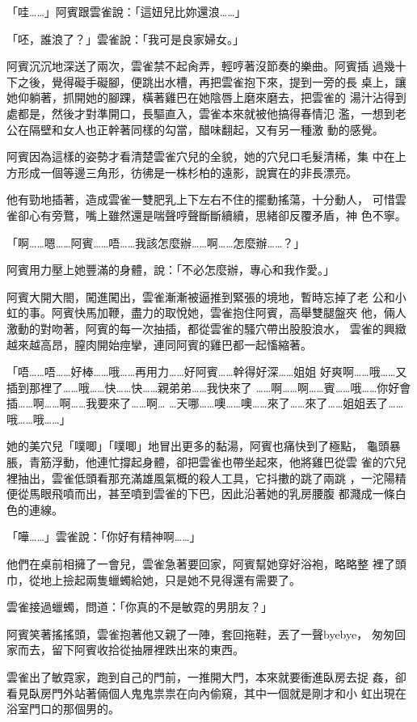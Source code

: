 「哇……」阿賓跟雲雀說：「這妞兒比妳還浪……」

「呸，誰浪了？」雲雀說：「我可是良家婦女。」

阿賓沉沉地深送了兩次，雲雀禁不起肏弄，輕哼著沒節奏的樂曲。阿賓插
過幾十下之後，覺得礙手礙腳，便跳出水槽，再把雲雀抱下來，提到一旁的長
桌上，讓她仰躺著，抓開她的腳踝，橫著雞巴在她陰唇上磨來磨去，把雲雀的
湯汁沾得到處都是，然後才對準開口，長驅直入，雲雀本來就被他搞得春情氾
濫，一想到老公在隔壁和女人也正幹著同樣的勾當，醋味翻起，又有另一種激
動的感覺。

阿賓因為這樣的姿勢才看清楚雲雀穴兒的全貌，她的穴兒口毛髮清稀，集
中在上方形成一個等邊三角形，彷彿是一株杉柏的遠影，說實在的非長漂亮。

他有勁地插著，造成雲雀一雙肥乳上下左右不住的擺動搖蕩，十分動人，
可惜雲雀卻心有旁鶩，嘴上雖然還是喘聲哼聲斷斷續續，思緒卻反覆矛盾，神
色不寧。

「啊……嗯……阿賓……唔……我該怎麼辦……啊……怎麼辦……？」

阿賓用力壓上她豐滿的身體，說：「不必怎麼辦，專心和我作愛。」

阿賓大開大閤，闖進闖出，雲雀漸漸被逼推到緊張的境地，暫時忘掉了老
公和小虹的事。阿賓快馬加鞭，盡力的取悅她，雲雀抱住阿賓，高舉雙腿盤夾
他，倆人激動的對吻著，阿賓的每一次抽插，都從雲雀的騷穴帶出股股浪水，
雲雀的興緻越來越高昂，膣肉開始痙攣，連同阿賓的雞巴都一起慉縮著。

「唔……唔……好棒……哦……再用力……好阿賓……幹得好深……姐姐
好爽啊……哦……又插到那裡了……哦……快……快……親弟弟……我快來了
……啊……啊……賓……哦……你好會插……啊……啊……我要來了……啊…
…天哪……噢……噢……來了……來了……姐姐丟了……哦……哦……」

她的美穴兒「噗唧」「噗唧」地冒出更多的黏湯，阿賓也痛快到了極點，
龜頭暴脹，青筋浮動，他連忙撐起身體，卻把雲雀也帶坐起來，他將雞巴從雲
雀的穴兒裡抽出，雲雀低頭看那充滿雄風氣概的殺人工具，它抖擻的跳了兩跳
，一沱陽精便從馬眼飛噴而出，甚至噴到雲雀的下巴，因此沿著她的乳房腰腹
都濺成一條白色的連線。

「嘩……」雲雀說：「你好有精神啊……」

他們在桌前相擁了一會兒，雲雀急著要回家，阿賓幫她穿好浴袍，略略整
裡了頭巾，從地上撿起兩隻蠟蠋給她，只是她不見得還有需要了。

雲雀接過蠟蠋，問道：「你真的不是敏霓的男朋友？」

阿賓笑著搖搖頭，雲雀抱著他又親了一陣，套回拖鞋，丟了一聲byebye，
匆匆回家而去，留下阿賓收拾從抽屜裡跌出來的東西。

雲雀出了敏霓家，跑到自己的門前，一推開大門，本來就要衝進臥房去捉
姦，卻看見臥房門外站著倆個人鬼鬼祟祟在向內偷窺，其中一個就是剛才和小
虹出現在浴室門口的那個男的。

